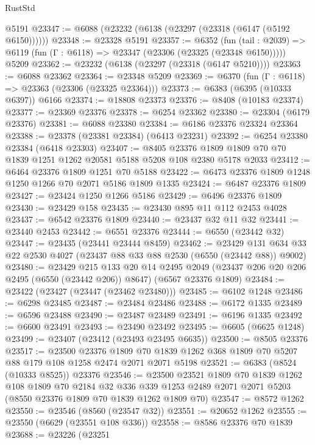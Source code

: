 \begin{lexlean}{RustStd}
\begin{coremodule}
    @5191
@23347 := @6088 (@23232 (@6138 (@23297 (@23318 (@6147 (@5192 @6150))))))
@23348 := @23328 @5191
@23357 := @6352
    (fun (tail : @2039) => @6119 (fun (Γ : @6118) => @23347 (@23306 (@23325 (@23348 @6150)))))
    @5209
@23362 := @23232 (@6138 (@23297 (@23318 (@6147 @5210))))
@23363 := @6088 @23362
@23364 := @23348 @5209
@23369 := @6370 (fun (Γ : @6118) => @23363 (@23306 (@23325 @23364)))
@23373 := @6383 (@6395 (@10333 @6397)) @6166
@23374 := @18808 @23373
@23376 := @8408 (@10183 @23374)
@23377 := @23369 @23376
@23378 := @6254 @23362
@23380 := @23304 (@6179 @23376)
@23381 := @6088 @23380
@23384 := @6186 @23376 @23324 @23364
@23388 := @23378 (@23381 @23384) (@6413 @23231)
@23392 := @6254 @23380 @23384 (@6418 @23303)
@23407 := @8405
    @23376
    @1809
    @1809
    @70
    @70
    @1839
    @1251
    @1262
    @20581
    @5188
    @5208
    @108
    @2380
    @5178
    @2033
@23412 := @6464 @23376 @1809 @1251 @70 @5188
@23422 := @6473 @23376 @1809 @1248 @1250 @1266 @70 @2071 @5186 @1809 @1335
@23424 := @6487 @23376 @1809
@23427 := @23424 @1250 @1266 @5186
@23429 := @6496 @23376 @1809
@23430 := @23429 @158
@23435 := @23430 @895 @11 @112 @2453 @4028
@23437 := @6542 @23376 @1809
@23440 := @23437 @32 @11 @32
@23441 := @23440 @2453
@23442 := @6551 @23376
@23444 := @6550 (@23442 @32)
@23447 := @23435 (@23441 @23444 @8459)
@23462 := @23429 @131 @634 @33 @22 @2530 @4027 (@23437 @88 @33 @88 @2530 (@6550 (@23442 @88)) @9002)
@23480 := @23429
    @215
    @133
    @20
    @14
    @2495
    @2049
    (@23437 @206 @20 @206 @2495 (@6550 (@23442 @206)) @8647)
    (@6567 @23376 @1809)
@23484 := @23422 (@23427 (@23447 (@23462 @23480)))
@23485 := @6102 @1248
@23486 := @6298 @23485
@23487 := @23484 @23486
@23488 := @6172 @1335
@23489 := @6596 @23488
@23490 := @23487 @23489
@23491 := @6196 @1335
@23492 := @6600 @23491
@23493 := @23490 @23492
@23495 := @6605 (@6625 @1248)
@23499 := @23407 (@23412 (@23493 @23495 @6635))
@23500 := @8505 @23376
@23517 := @23500
    @23376
    @1809
    @70
    @1839
    @1262
    @368
    @1809
    @70
    @5207
    @88
    @179
    @108
    @1258
    @2474
    @2071
    @2071
    @5198
@23521 := @6383 (@8524 (@10333 @8525)) @23376
@23546 := @23500
    @23521
    @1809
    @70
    @1839
    @1262
    @108
    @1809
    @70
    @2184
    @32
    @336
    @339
    @1253
    @2489
    @2071
    @2071
    @5203
    (@8550 @23376 @1809 @70 @1839 @1262 @1809 @70)
@23547 := @8572 @1262
@23550 := @23546 (@8560 (@23547 @32))
@23551 := @20652 @1262
@23555 := @23550 (@6629 (@23551 @108 @336))
@23558 := @8586 @23376 @70 @1839
@23688 := @23226
    (@23251

\end{coremodule}
\end{lexlean}
